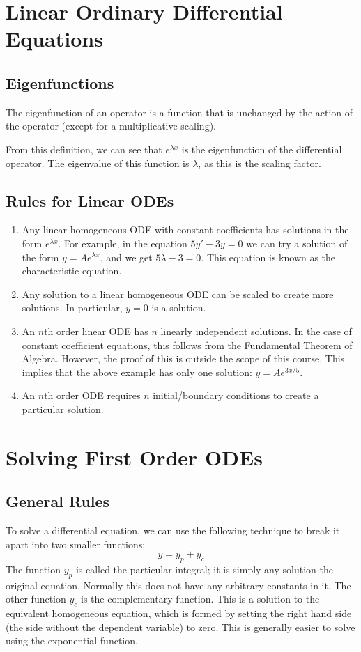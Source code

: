 \documentclass{article}
\begin{document}
\section{Linear Ordinary Differential Equations}
\subsection{Eigenfunctions}
\begin{definition}
    The eigenfunction of an operator is a function that is unchanged by the action of the operator (except for a multiplicative scaling).
\end{definition}
From this definition, we can see that $e^{\lambda x}$ is the eigenfunction of the differential operator. The eigenvalue of this function is $\lambda$, as this is the scaling factor.

\subsection{Rules for Linear ODEs}
\begin{enumerate}
    \item Any linear homogeneous ODE with constant coefficients has solutions in the form $e^{\lambda x}$. For example, in the equation $5y' - 3y = 0$ we can try a solution of the form $y = Ae^{\lambda x}$, and we get $5 \lambda - 3 = 0$. This equation is known as the characteristic equation.
    \item Any solution to a linear homogeneous ODE can be scaled to create more solutions. In particular, $y=0$ is a solution.
    \item An $n$th order linear ODE has $n$ linearly independent solutions. In the case of constant coefficient equations, this follows from the Fundamental Theorem of Algebra. However, the proof of this is outside the scope of this course. This implies that the above example has only one solution: $y = Ae^{3x/5}$.
    \item An $n$th order ODE requires $n$ initial/boundary conditions to create a particular solution.
\end{enumerate}

\section{Solving First Order ODEs}
\subsection{General Rules}
To solve a differential equation, we can use the following technique to break it apart into two smaller functions:
\[ y = y_p + y_c \]
The function $y_p$ is called the particular integral; it is simply any solution
the original equation. Normally this does not have any arbitrary constants in it. The other function $y_c$ is the complementary function. This is a solution to the equivalent homogeneous equation, which is formed by setting the right hand side (the side without the dependent variable) to zero. This is generally easier to solve using the exponential function.
\end{document}
